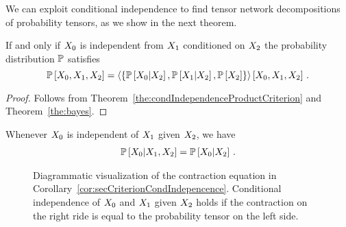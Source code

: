 We can exploit conditional independence to find tensor network decompositions of probability tensors, as we show in the next theorem.

\begin{corollary}\label{cor:secCriterionCondIndepencence}
	If and only if $X_{0}$ is independent from $X_{1}$ conditioned on $X_{2}$ the probability distribution $\mathbb{P}$ satisfies
		\[ \mathbb{P}\left[X_{0}, X_{1}, X_{2}\right] 
		= \left\langle 
			\{ \mathbb{P}\left[X_{0}|X_{2}\right], \mathbb{P}\left[X_{1}|X_{2}\right], \mathbb{P}\left[X_{2}\right] \}
		\right\rangle \left[ 
			X_{0}, X_{1}, X_{2}
		 \right] \, .
		\]
\end{corollary}
\begin{proof}
	Follows from Theorem~\ref{the:condIndependenceProductCriterion} and Theorem~\ref{the:bayes}.
\end{proof}


\begin{corollary}\label{cor:conditionDropping}
	Whenever $X_{0}$ is independent of $X_{1}$ given $X_{2}$, we have
	\begin{align*}
		\mathbb{P}\left[X_{0}|X_{1},X_{2}\right] = \mathbb{P}\left[X_{0}|X_{2}\right] \, .
	\end{align*}
\end{corollary}


\begin{figure}[h]
\begin{center}
	
\end{center}
\caption{Diagrammatic visualization of the contraction equation in Corollary~\ref{cor:secCriterionCondIndepencence}. Conditional independence of $X_{0}$ and $X_{1}$ given $X_{2}$ holds if the contraction on the right ride is equal to the probability tensor on the left side.}
\end{figure}



